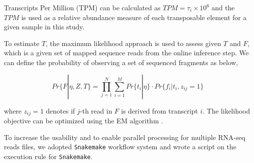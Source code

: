 \documentclass[wsdraft]{ws-procs11x85}
\begin{document}
Transcripts Per Million (TPM) can be calculated as $TPM=\tau_i \times 10^6$ and the $TPM$ is used as a relative abundance measure of each transposable element for a given sample in this study.
% 
% 
% 
%

To estimate $T$, the maximum likelihood approach is used to assess given $T$ and $F$, which is a given set of mapped sequence reads from 
% 
% 
% 
%
% 
%
% 
% 
% 
%
% 
%
% 
% 
% 
%
the online inference step.
We can define the probability of observing a set of sequenced fragments as below,

\begin{equation} \label{eq:3}
Pr\{F|\eta,Z, T \}=
\prod_{j=1}^{N}\sum_{i=1}^{M} Pr\{ t_i | \eta \}  \cdot
 Pr \{ f_i | t_i , z_{ij} = 1 \}
\end{equation}

where $z_{ij} = 1$ denotes if $j$-th read in $F$ is derived from transcript $i$. The likelihood objective can be optimized using the EM algorithm \cite{li2009rna}.
% 
% 

To increase the usability and to enable parallel processing for multiple RNA-seq reads files, we adopted \verb|Snakemake| workflow system and wrote a script on the execution rule for \verb|Snakemake|.\cite{koster2012snakemake}
% 
% 
% 
%
% 
%
\end{document}
